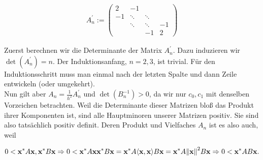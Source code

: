 \begin{align*}
  A_n^\prime :=
  \begin{pmatrix}
     2 &  -1     &        &    \\
    -1 &  \ddots & \ddots &    \\
       &  \ddots & \ddots & -1 \\
       &         & -1     &  2
  \end{pmatrix}
\end{align*}

Zuerst berechnen wir die Determinante der Matrix $A_n^\prime$. Dazu induzieren wir $\det(A_n^\prime) = n$. Der Induktionsanfang, $n = 2, 3$, ist trivial. Für den Induktionsschritt muss man einmal nach der letzten Spalte und dann Zeile entwickeln (oder umgekehrt). \\

Nun gilt aber $A_n = \frac{1}{h^2} A_n^\prime$ und $\det(B_n^{-1}) > 0$, da wir nur $c_0,c_1$ mit denselben Vorzeichen betrachten. Weil die Determinante dieser Matrizen bloß das Produkt ihrer Komponenten ist, sind alle Hauptminoren unserer Matrizen positiv. Sie sind also tatsächlich positiv definit. Deren Produkt und Vielfaches $A_n$ ist es also auch, weil

\begin{align*}
  0 < \mathbf{x}^\ast A \mathbf{x}, \mathbf{x}^\ast B \mathbf{x}
  \Rightarrow
  0 < \mathbf{x}^\ast A \mathbf{x} \mathbf{x}^\ast B \mathbf{x} =
  \mathbf{x}^\ast A {\left < \mathbf{x}, \mathbf{x} \right >} B \mathbf{x} =
  \mathbf{x}^\ast A {\left \| \mathbf{x} \right \|}_{}^2 B \mathbf{x}
  \Rightarrow
  0 < \mathbf{x}^\ast AB \mathbf{x}.
\end{align*}

\newpage
